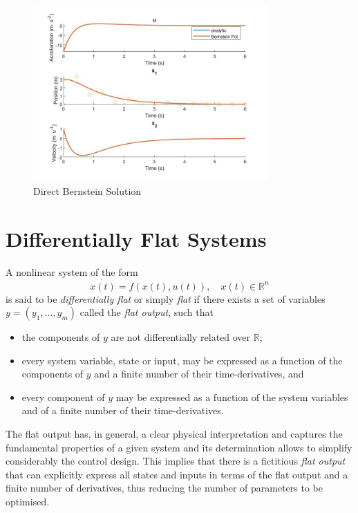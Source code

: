 \begin{figure}[h!]
\centering
\includegraphics[width=0.8\textwidth]{Images/bernstein_1d.jpg}
\caption{Direct Bernstein Solution}
\label{fig:bernstein_1d}
\end{figure}

\section{Differentially Flat Systems}
\label{sec:differentiallyflatsystems}

\par A nonlinear system of the form
\begin{equation}
    \dot{x(t)} = f(x(t),u(t)), \quad x(t) \in \mathbb{R}^n
\end{equation}
is said to be \textit{differentially flat} \cite{fliess1995flatness} or simply \textit{flat} if there exists a set of variables $y = (y_1, \dots, y_m)$ called the \textit{flat output}, such that
\begin{itemize}
    \item the components of $y$ are not differentially related over $\mathbb{R}$;
    \item every system variable, state or input, may be expressed as a function of the components of $y$ and a finite number of their time-derivatives, and 
    \item every component of $y$ may be expressed as a function of the system variables and of a finite number of their time-derivatives. 
\end{itemize}

\par The flat output has, in general, a clear physical interpretation and captures the fundamental properties of a given system and its determination allows to simplify considerably the control design. This implies that there is a fictitious \textit{flat output} that can explicitly express all states and inputs in terms of the flat output and a finite number of derivatives, thus reducing the number of parameters to be optimised.



